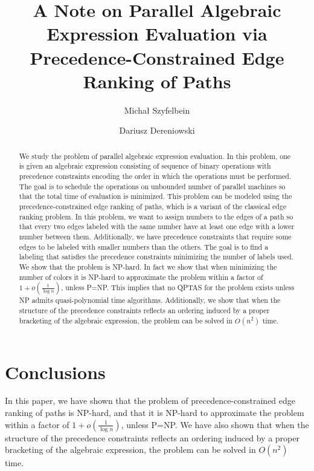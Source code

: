 \documentclass[a4paper,UKenglish,cleveref, autoref, thm-restate]{lipics-v2021}
\title{A Note on Parallel Algebraic Expression Evaluation via Precedence-Constrained Edge Ranking of Paths} %
\author{Michał Szyfelbein}{Gdańsk University of Technology, Poland}{johnqpublic@dummyuni.org}{https://orcid.org/0000-0002-1825-0097}{}%
\author{Dariusz Dereniowski}{Gdańsk University of Technology, Poland}{joanrpublic@dummycollege.org}{[orcid]}{}
\newcommand{\br}[1]{\mathopen{}\left( #1 \right)}
\begin{document}
\maketitle

\begin{abstract}
We study the problem of parallel algebraic expression evaluation. In this problem, one is given an algebraic expression consisting of sequence of binary operations with precedence constraints encoding the order in which the operations must be performed. The goal is to schedule the operations on unbounded number of parallel machines so that the total time of evaluation is minimized. This problem can be modeled using the precedence-constrained edge ranking of paths, which is a variant of the classical edge ranking problem. In this problem, we want to assign numbers to the edges of a path so that every two edges labeled with the same number have at least one edge with a lower number between them. Additionally, we have precedence constraints that require some edges to be labeled with smaller numbers than the others.
The goal is to find a labeling that satisfies the precedence constraints minimizing the number of labels used.
We show that the problem is NP-hard. In fact we show that when minimizing the number of colors it is NP-hard to approximate the problem within a factor of $1+o\br{\frac{1}{\log n}}$, unless P=NP. This implies that no QPTAS for the problem exists unless NP admits quasi-polynomial time algorithms.
Additionally, we show that when the structure of the precedence constraints reflects an ordering induced by a proper bracketing of the algebraic expression, the problem can be solved in $O(n^2)$ time.
\end{abstract}




%
%

\section{Conclusions}
\label{sec:conclusions}

In this paper, we have shown that the problem of precedence-constrained edge ranking of paths is NP-hard, and that it is NP-hard to approximate the problem within a factor of $1+o\br{\frac{1}{\log n}}$, unless P=NP. We have also shown that when the structure of the precedence constraints reflects an ordering induced by a proper bracketing of the algebraic expression, the problem can be solved in $O(n^2)$ time. 
\end{document}
